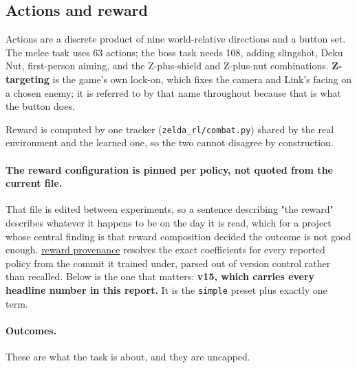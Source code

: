 \documentclass[11pt]{article}
\begin{document}
\subsection{Actions and reward}
\label{sec:2.2}

Actions are a discrete product of nine world-relative directions and a button set. The melee task uses 63 actions; the boss task needs 108, adding slingshot, Deku Nut, first-person aiming, and the Z-plus-shield and Z-plus-nut combinations. \textbf{Z-targeting} is the game's own lock-on, which fixes the camera and Link's facing on a chosen enemy; it is referred to by that name throughout because that is what the button does.

Reward is computed by one tracker (\texttt{zelda\_rl/combat.py}) shared by the real environment and the learned one, so the two cannot disagree by construction.

\paragraph{The reward configuration is pinned per policy, not quoted from the current file.} That file is edited between experiments, so a sentence describing "the reward" describes whatever it happens to be on the day it is read, which for a project whose central finding is that reward composition decided the outcome is not good enough. \href{https://github.com/JordyKieto/ppo-hyrule/blob/main/docs/REWARD_PROVENANCE.md}{reward provenance} resolves the exact coefficients for every reported policy from the commit it trained under, parsed out of version control rather than recalled. Below is the one that matters: \textbf{v15, which carries every headline number in this report.} It is the \texttt{simple} preset plus exactly one term.

\paragraph{Outcomes.} These are what the task is about, and they are uncapped.
\end{document}
